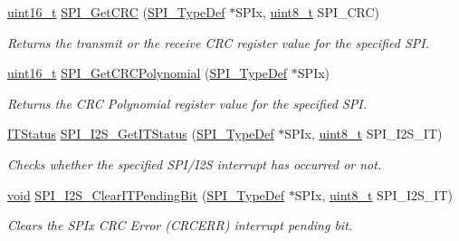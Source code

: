 \begin{DoxyCompactItemize}
\hyperlink{_p_e___types_8h_a1f1825b69244eb3ad2c7165ddc99c956}{uint16\+\_\+t} \hyperlink{group___s_p_i___exported___functions_ga4c81c193516e82cf0a2fdc149ef20cc6}{S\+P\+I\+\_\+\+Get\+C\+RC} (\hyperlink{struct_s_p_i___type_def}{S\+P\+I\+\_\+\+Type\+Def} $\ast$S\+P\+Ix, \hyperlink{_p_e___types_8h_aba7bc1797add20fe3efdf37ced1182c5}{uint8\+\_\+t} S\+P\+I\+\_\+\+C\+RC)
\begin{DoxyCompactList}\small\item\em Returns the transmit or the receive C\+RC register value for the specified S\+PI. \end{DoxyCompactList}\item 
\hyperlink{_p_e___types_8h_a1f1825b69244eb3ad2c7165ddc99c956}{uint16\+\_\+t} \hyperlink{group___s_p_i___exported___functions_ga80fb9374cfce670f29128bb78568353f}{S\+P\+I\+\_\+\+Get\+C\+R\+C\+Polynomial} (\hyperlink{struct_s_p_i___type_def}{S\+P\+I\+\_\+\+Type\+Def} $\ast$S\+P\+Ix)
\begin{DoxyCompactList}\small\item\em Returns the C\+RC Polynomial register value for the specified S\+PI. \end{DoxyCompactList}\item 
\hyperlink{agilefox_2library_2inc_2stm32f10x__type_8h_aacbd7ed539db0aacd973a0f6eca34074}{I\+T\+Status} \hyperlink{group___s_p_i___exported___functions_ga72decbc1cd79f8fad92a2204beca6bc5}{S\+P\+I\+\_\+\+I2\+S\+\_\+\+Get\+I\+T\+Status} (\hyperlink{struct_s_p_i___type_def}{S\+P\+I\+\_\+\+Type\+Def} $\ast$S\+P\+Ix, \hyperlink{_p_e___types_8h_aba7bc1797add20fe3efdf37ced1182c5}{uint8\+\_\+t} S\+P\+I\+\_\+\+I2\+S\+\_\+\+IT)
\begin{DoxyCompactList}\small\item\em Checks whether the specified S\+P\+I/\+I2S interrupt has occurred or not. \end{DoxyCompactList}\item 
\hyperlink{usb__devapi_8h_afabf60e7f57651d6d595a02c75f07cd0}{void} \hyperlink{group___s_p_i___exported___functions_ga35a524a49ff3d058137060f751e8749f}{S\+P\+I\+\_\+\+I2\+S\+\_\+\+Clear\+I\+T\+Pending\+Bit} (\hyperlink{struct_s_p_i___type_def}{S\+P\+I\+\_\+\+Type\+Def} $\ast$S\+P\+Ix, \hyperlink{_p_e___types_8h_aba7bc1797add20fe3efdf37ced1182c5}{uint8\+\_\+t} S\+P\+I\+\_\+\+I2\+S\+\_\+\+IT)
\begin{DoxyCompactList}\small\item\em Clears the S\+P\+Ix C\+RC Error (C\+R\+C\+E\+RR) interrupt pending bit. \end{DoxyCompactList}\end{DoxyCompactItemize}


